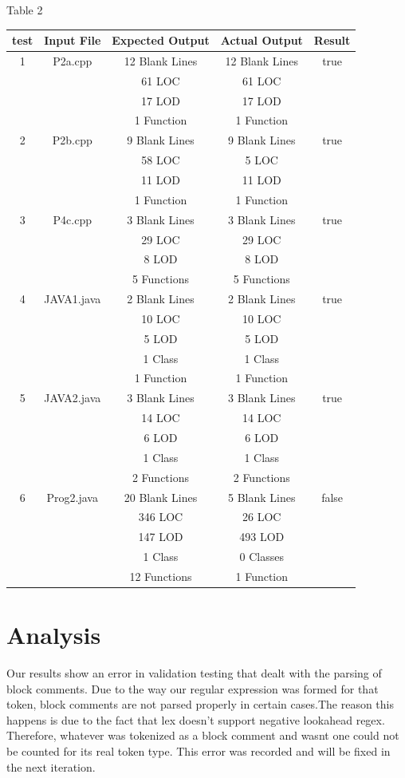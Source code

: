 \documentclass{scrreprt}
\begin{document}
	Table 2\\
	\begin{tabular}{|c|c|c|c|c|}
		\hline
		test & Input File & Expected Output & Actual Output & Result \\ \hline
		1 & P2a.cpp & 12 Blank Lines & 12 Blank Lines & true\\ &&61 LOC&61 LOC&\\&&17 LOD&17 LOD&\\&&1 Function&1 Function&\\ \hline
		
		2 & P2b.cpp & 9 Blank Lines & 9 Blank Lines & true\\ &&58 LOC&5 LOC&\\&&11 LOD&11 LOD&\\&&1 Function&1 Function&\\ \hline
		
		3 & P4c.cpp & 3 Blank Lines & 3 Blank Lines & true\\ &&29 LOC&29 LOC&\\&&8 LOD&8 LOD&\\&&5 Functions&5 Functions&\\ \hline
		
		4 & JAVA1.java & 2 Blank Lines & 2 Blank Lines & true\\ &&10 LOC&10 LOC&\\&&5 LOD&5 LOD&\\&&1 Class&1 Class&\\&&1 Function&1 Function&\\ \hline
		
		5 & JAVA2.java & 3 Blank Lines & 3 Blank Lines & true\\ &&14 LOC&14 LOC&\\&&6 LOD&6 LOD&\\&&1 Class&1 Class&\\&&2 Functions&2 Functions&\\ \hline
		
		6 & Prog2.java & 20 Blank Lines & 5 Blank Lines & false\\ &&346 LOC&26 LOC&\\&&147 LOD&493 LOD&\\&&1 Class&0 Classes&\\&&12 Functions&1 Function&\\ \hline
		
		
	\end{tabular}


{\let\clearpage\relax \chapter{Analysis}}
Our results show an error in validation testing that dealt with the parsing of block comments. Due to the way our regular expression was formed for that token, block comments are not parsed properly in certain cases.The reason this happens is due to the fact that lex doesn't support negative lookahead regex. Therefore, whatever was tokenized as a block comment and wasnt one could not be counted for its real token type. This error was recorded and will be fixed in the next iteration.
\end{document}
